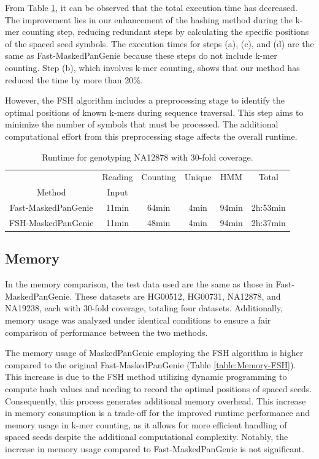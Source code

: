 \documentclass[PhD]{PHlab-thesis}
\begin{document}
From Table \ref{table:RuntimeFSH}, it can be observed that the total execution time has decreased. The improvement lies in our enhancement of the hashing method during the k-mer counting step, reducing redundant steps by calculating the specific positions of the spaced seed symbols. The execution times for steps (a), (c), and (d) are the same as Fast-MaskedPanGenie because these steps do not include k-mer counting. Step (b), which involves k-mer counting, shows that our method has reduced the time by more than 20\%.

However, the FSH algorithm includes a preprocessing stage to identify the optimal positions of known k-mers during sequence traversal. This step aims to minimize the number of symbols that must be processed. The additional computational effort from this preprocessing stage affects the overall runtime.
\begin{table}[ht!]
	\centering
	\begin{tabular*}{\textwidth}{@{\extracolsep{\fill}}cccccc@{\extracolsep{\fill}}}
        \toprule
         & Reading & Counting & Unique & HMM & Total\\
         Method & Input & & & &\\
        \midrule
        Fast-MaskedPanGenie& 11min & 64min & 4min & 94min & 2h:53min\\
        FSH-MaskedPanGenie& 11min & 48min & 4min & 94min & 2h:37min\\
        \bottomrule 
	\end{tabular*}
    \caption{Runtime for genotyping NA12878 with 30-fold coverage.}
	\label{table:RuntimeFSH}
\end{table}

\subsection{Memory}
In the memory comparison, the test data used are the same as those in Fast-MaskedPanGenie. These datasets are HG00512, HG00731, NA12878, and NA19238, each with 30-fold coverage, totaling four datasets. Additionally, memory usage was analyzed under identical conditions to ensure a fair comparison of performance between the two methods.

The memory usage of MaskedPanGenie employing the FSH algorithm is higher compared to the original Fast-MaskedPanGenie (Table \ref{table:Memory-FSH}). This increase is due to the FSH method utilizing dynamic programming to compute hash values and needing to record the optimal positions of spaced seeds. Consequently, this process generates additional memory overhead. This increase in memory consumption is a trade-off for the improved runtime performance and memory usage in k-mer counting, as it allows for more efficient handling of spaced seeds despite the additional computational complexity.
Notably, the increase in memory usage compared to Fast-MaskedPanGenie is not significant.
\end{document}
